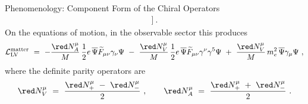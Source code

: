 \documentclass[pdf,PItalk,slideColor,colorBG,accumulate]{prosper}
\begin{document}
{\begin{slide}[Replace]{ Phenomenology: Component Form of the Chiral Operators }
\begin{gather*}
   \Big] ~.
\end{gather*}
%
	On the equations of motion, in the observable sector this 
	produces
\begin{equation*}
   \mathcal{L}_{\rm LV}^{\rm matter} ~=~ 
        -
       \frac{{\red N_A^\mu}}
              {M} \, \frac{1}{2}e \,
       \overline{\Psi} \widetilde{F}_{\mu\nu}
                       \gamma_\nu \Psi 
     ~-~
        \frac{{\red N_V^\mu}}
              {M} \, \frac{1}{2}e \,
       \overline{\Psi} \widetilde{F}_{\mu\nu}
                       \gamma^\nu \gamma^5 \Psi 
~+~  \frac{{\red N_V^\mu}}{M} \,m_e^2\, \overline{\Psi} \gamma_\mu \Psi
     ~,
\end{equation*}
%
	where the definite parity operators are
\begin{equation*}
      {\red N^\mu_V} ~=~  \frac{ {\red N_+^\mu} ~-~ {\red N_-^\mu} }{2}~,   
\qquad 
      {\red N^\mu_A} ~=~  \frac{ {\red N_+^\mu} ~+~ {\red N_-^\mu} }{2}~.
\end{equation*}
%

\end{slide}
}

\end{document}
